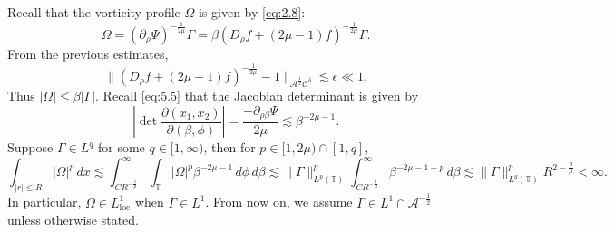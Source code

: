 \documentclass[11pt]{article}
\theoremstyle{definition}
\theoremstyle{remark}
\numberwithin{equation}{section}
\newcommand{\mbb}{\mathbb}
\newcommand{\mcal}{\mathcal}
\renewcommand{\hat}{\widehat}
\newcommand{\Z}{\mbb{Z}}
\newcommand{\R}{\mbb{R}}
\newcommand{\del}{\partial}
\newcommand{\abs}[1]{\left\lvert #1 \right\rvert}
\newcommand{\norm}[1]{\lVert #1 \rVert}
\begin{document}
Recall that the vorticity profile $\Omega$ is given by \eqref{eq:2.8}:
\[\Omega = (\del_\rho \Psi)^{-\frac{1}{2\mu}} \Gamma = \beta (D_\rho f + (2\mu - 1)f)^{-\frac{1}{2\mu}} \Gamma.\]
From the previous estimates,
\[ \norm{(D_\rho f + (2\mu - 1)f)^{-\frac{1}{2\mu}} - 1}_{\mcal{A}^{\frac{1}{2}} \mcal{C}^\delta} \lesssim \epsilon \ll 1.\]
Thus $|\Omega| \leq \beta |\Gamma|$. Recall \eqref{eq:5.5} that the Jacobian determinant is given by
\[ \abs{ \det \frac{\del(x_1, x_2)}{\del(\beta,\phi)}} = \frac{-\del_{\rho \beta} \Psi}{2\mu} \lesssim \beta^{-2\mu - 1}. \]
Suppose $\Gamma\in L^q$ for some $q \in [1,\infty)$, then for $p\in [1,2\mu) \cap [1,q]$,
\[ \int_{|r| \leq R} |\Omega|^p \,dx \lesssim \int_{C R^{-\frac{1}{\mu}}}^\infty \int_{\mbb{T}} |\Omega|^p \beta^{-2\mu - 1} \,d\phi \,d\beta \lesssim \norm{\Gamma}_{L^p(\mbb{T})}^p \int_{C R^{-\frac{1}{\mu}}}^\infty \beta^{-2\mu-1+p} \,d\beta \lesssim \norm{\Gamma}_{L^q(\mbb{T})}^p R^{2 - \frac{p}{\mu}} < \infty. \]
In particular, $\Omega\in L^1_{\text{loc}}$ when $\Gamma\in L^1$. From now on, we assume $\Gamma\in L^1 \cap \mcal{A}^{-\frac{1}{2}}$ unless otherwise stated.
\end{document}
